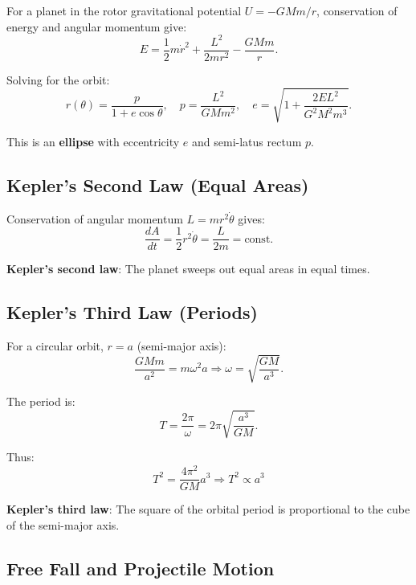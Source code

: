 \documentclass[12pt,a4paper]{article}
\theoremstyle{definition}
\theoremstyle{remark}
\begin{document}
For a planet in the rotor gravitational potential $U = -GMm/r$, conservation of energy and angular momentum give:
\begin{equation}
E = \frac{1}{2}m\dot{r}^2 + \frac{L^2}{2mr^2} - \frac{GMm}{r}.
\end{equation}

Solving for the orbit:
\begin{equation}
r(\theta) = \frac{p}{1 + e\cos\theta}, \quad p = \frac{L^2}{GMm^2}, \quad e = \sqrt{1 + \frac{2EL^2}{G^2M^2m^3}}.
\end{equation}

This is an \textbf{ellipse} with eccentricity $e$ and semi-latus rectum $p$.

\subsection{Kepler's Second Law (Equal Areas)}

Conservation of angular momentum $L = mr^2\dot{\theta}$ gives:
\begin{equation}
\frac{dA}{dt} = \frac{1}{2}r^2 \dot{\theta} = \frac{L}{2m} = \text{const}.
\end{equation}

\textbf{Kepler's second law}: The planet sweeps out equal areas in equal times.

\subsection{Kepler's Third Law (Periods)}

For a circular orbit, $r = a$ (semi-major axis):
\begin{equation}
\frac{GMm}{a^2} = m\omega^2 a \Rightarrow \omega = \sqrt{\frac{GM}{a^3}}.
\end{equation}

The period is:
\begin{equation}
T = \frac{2\pi}{\omega} = 2\pi\sqrt{\frac{a^3}{GM}}.
\end{equation}

Thus:
\begin{equation}
\boxed{T^2 = \frac{4\pi^2}{GM} a^3 \Rightarrow T^2 \propto a^3}
\end{equation}

\textbf{Kepler's third law}: The square of the orbital period is proportional to the cube of the semi-major axis.

\subsection{Free Fall and Projectile Motion}
\end{document}
